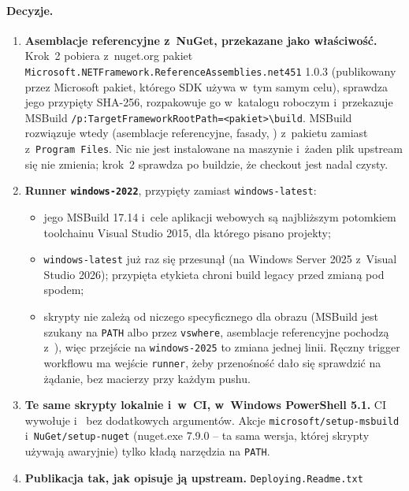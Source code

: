 \paragraph{Decyzje.}
\begin{enumerate}
  \item \textbf{Asemblacje referencyjne z~NuGet, przekazane jako właściwość.} Krok~2
    pobiera z~nuget.org pakiet \texttt{Microsoft.NETFramework.ReferenceAssemblies.net451}
    1.0.3 (publikowany przez Microsoft pakiet, którego SDK używa w~tym samym celu),
    sprawdza jego przypięty SHA-256, rozpakowuje go w~katalogu roboczym i~przekazuje
    MSBuild \texttt{/p:TargetFrameworkRootPath=<pakiet>\textbackslash{}build}. MSBuild
    rozwiązuje wtedy  (asemblacje referencyjne, fasady,
    ) z~pakietu zamiast z~\texttt{Program Files}. Nic nie
    jest instalowane na maszynie i~żaden plik upstream się nie zmienia; krok~2 sprawdza
    po buildzie, że checkout jest nadal czysty.
  \item \textbf{Runner \texttt{windows-2022}}, przypięty zamiast \texttt{windows-latest}:
    \begin{itemize}
      \item jego MSBuild 17.14 i~cele aplikacji webowych są najbliższym potomkiem toolchainu
        Visual Studio 2015, dla którego pisano projekty;
      \item \texttt{windows-latest} już raz się przesunął (na Windows Server 2025
        z~Visual Studio 2026); przypięta etykieta chroni build legacy przed zmianą pod
        spodem;
      \item skrypty nie zależą od niczego specyficznego dla obrazu (MSBuild jest szukany na
        \texttt{PATH} albo przez \texttt{vswhere}, asemblacje referencyjne pochodzą
        z~), więc przejście na \texttt{windows-2025} to zmiana jednej
        linii. Ręczny trigger workflowu ma wejście \texttt{runner}, żeby przenośność dało
        się sprawdzić na żądanie, bez macierzy przy każdym pushu.
    \end{itemize}
  \item \textbf{Te same skrypty lokalnie i~w~CI, w~Windows PowerShell 5.1.} CI wywołuje
     i~ bez
    dodatkowych argumentów. Akcje \texttt{microsoft/setup-msbuild} i~\texttt{NuGet/setup-nuget}
    (nuget.exe 7.9.0 -- ta sama wersja, której skrypty używają awaryjnie) tylko kładą
    narzędzia na \texttt{PATH}.
  \item \textbf{Publikacja tak, jak opisuje ją upstream.} \texttt{Deploying.Readme.txt}

\end{enumerate}
